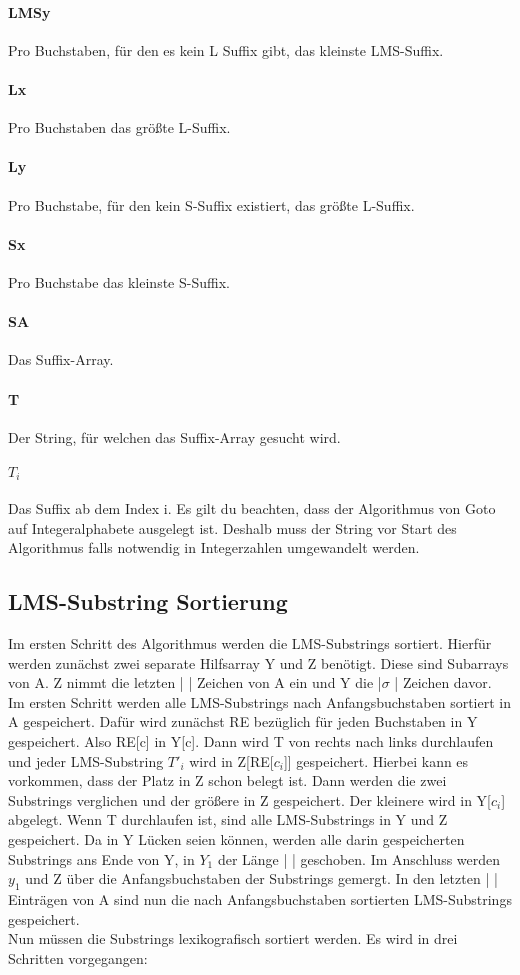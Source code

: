 \paragraph{LMSy} Pro Buchstaben, für den es kein L Suffix gibt, das kleinste LMS-Suffix.
\paragraph{Lx} Pro Buchstaben das größte L-Suffix. 
\paragraph{Ly} Pro Buchstabe, für den kein S-Suffix existiert, das größte L-Suffix.
\paragraph{Sx} Pro Buchstabe das kleinste S-Suffix.
\paragraph{SA} Das Suffix-Array.
\paragraph{T} Der String, für welchen das Suffix-Array gesucht wird.
\paragraph{$T_{i}$} Das Suffix ab dem Index i.
\bigskip
Es gilt du beachten, dass der Algorithmus von Goto auf Integeralphabete ausgelegt ist. Deshalb muss der String vor Start des Algorithmus falls notwendig in Integerzahlen umgewandelt werden.

\subsection{LMS-Substring Sortierung}
Im ersten Schritt des Algorithmus werden die LMS-Substrings sortiert. Hierfür werden zunächst zwei separate Hilfsarray Y und Z benötigt. Diese sind Subarrays von A. Z nimmt die letzten | \lmsxnot| Zeichen von A ein und Y die |$\sigma$ | Zeichen davor. Im ersten Schritt werden alle LMS-Substrings nach Anfangsbuchstaben sortiert in A gespeichert. Dafür wird zunächst RE bezüglich \lmsxnot für jeden Buchstaben in Y gespeichert. Also RE[c] in Y[c]. Dann wird T von rechts nach links durchlaufen und jeder LMS-Substring $T'_{i}$ wird in Z[RE[$c_{i}$]] gespeichert. Hierbei kann es vorkommen, dass der Platz in Z schon belegt ist. Dann werden die zwei Substrings verglichen und der größere in Z gespeichert. Der kleinere wird in Y[$c_{i}$] abgelegt. Wenn T durchlaufen ist, sind alle LMS-Substrings in Y und Z gespeichert. Da in Y Lücken seien können, werden alle darin gespeicherten Substrings ans Ende von Y, in $Y_{1}$ der Länge | \lmsx | geschoben. Im Anschluss werden $y_{1}$ und Z über die Anfangsbuchstaben der Substrings gemergt. In den letzten | \lms | Einträgen von A sind nun die nach Anfangsbuchstaben sortierten LMS-Substrings gespeichert. \\
Nun müssen die Substrings lexikografisch sortiert werden. Es wird in drei Schritten vorgegangen:
